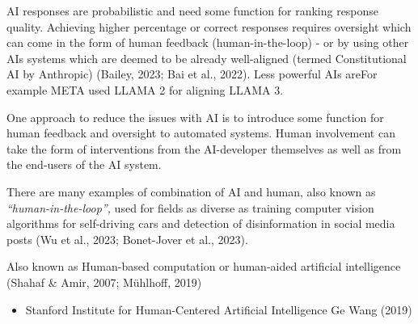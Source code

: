 \documentclass[
  letterpaper,
  DIV=11,
  numbers=noendperiod]{scrartcl}
\providecommand{\tightlist}{%
  \setlength{\itemsep}{0pt}\setlength{\parskip}{0pt}}\usepackage{longtable,booktabs,array}
\begin{document}
AI responses are probabilistic and need some function for ranking
response quality. Achieving higher percentage or correct responses
requires oversight which can come in the form of human feedback
(human-in-the-loop) - or by using other AIs systems which are deemed to
be already well-aligned (termed Constitutional AI by Anthropic) (Bailey,
2023; Bai et al., 2022). Less powerful AIs areFor example META used
LLAMA 2 for aligning LLAMA 3.

One approach to reduce the issues with AI is to introduce some function
for human feedback and oversight to automated systems. Human involvement
can take the form of interventions from the AI-developer themselves as
well as from the end-users of the AI system.

There are many examples of combination of AI and human, also known as
\emph{``human-in-the-loop'',} used for fields as diverse as training
computer vision algorithms for self-driving cars and detection of
disinformation in social media posts (Wu et al., 2023; Bonet-Jover et
al., 2023).

Also known as Human-based computation or human-aided artificial
intelligence (Shahaf \& Amir, 2007; Mühlhoff, 2019)

\begin{itemize}
\tightlist
\item
  Stanford Institute for Human-Centered Artificial Intelligence Ge Wang
  (2019)
\end{itemize}
\end{document}
